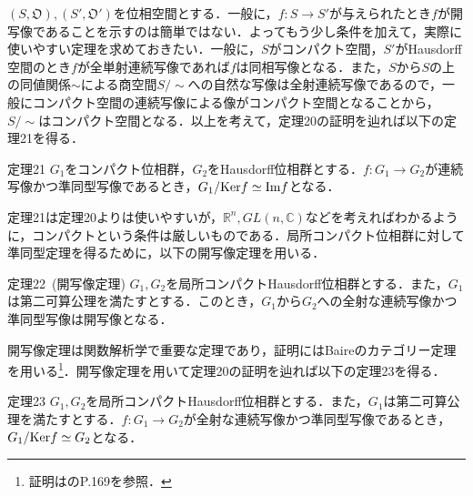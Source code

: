 \documentclass[a4paper,11pt]{jsarticle}
\begin{document}
$(S,\mathfrak{O}),(S',\mathfrak{O}')$を位相空間とする．一般に，$f:S\to S'$が与えられたとき$f$が開写像であることを示すのは簡単ではない．よってもう少し条件を加えて，実際に使いやすい定理を求めておきたい．一般に，$S$がコンパクト空間，$S'$がHausdorff空間のとき$f$が全単射連続写像であれば$f$は同相写像となる．また，$S$から$S$の上の同値関係$\sim$による商空間$S/\sim$への自然な写像は全射連続写像であるので，一般にコンパクト空間の連続写像による像がコンパクト空間となることから，$S/\sim$はコンパクト空間となる．以上を考えて，定理20の証明を辿れば以下の定理21を得る．
\begin{itembox}[l]{定理21}
$G_1$をコンパクト位相群，$G_2$をHausdorff位相群とする．$f:G_1\to G_2$が連続写像かつ準同型写像であるとき，$G_1/{\rm Ker}f\simeq {\rm Im}f$となる．
\end{itembox}
定理21は定理20よりは使いやすいが，$\mathbb{R}^n,GL(n,\mathbb{C})$などを考えればわかるように，コンパクトという条件は厳しいものである．局所コンパクト位相群に対して準同型定理を得るために，以下の開写像定理を用いる．
\begin{itembox}[l]{定理22{\ }(開写像定理)}
$G_1,G_2$を局所コンパクトHausdorff位相群とする．また，$G_1$は第二可算公理を満たすとする．このとき，$G_1$から$G_2$への全射な連続写像かつ準同型写像は開写像となる．
\end{itembox}
開写像定理は関数解析学で重要な定理であり，証明にはBaireのカテゴリー定理を用いる\footnote{証明は\cite{matsushima}のP.169を参照．}．開写像定理を用いて定理20の証明を辿れば以下の定理23を得る．
\begin{itembox}[l]{定理23}
$G_1,G_2$を局所コンパクトHausdorff位相群とする．また，$G_1$は第二可算公理を満たすとする．$f:G_1\to G_2$が全射な連続写像かつ準同型写像であるとき，$G_1/{\rm Ker}f\simeq G_2$となる．
\end{itembox}
%
%
%
%
\end{document}
